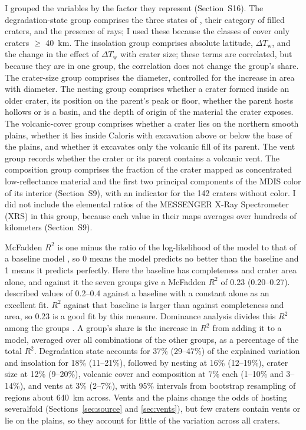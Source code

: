 \documentclass[article,review]{planetary}
\begin{document}
I grouped the variables by the factor they represent (Section~S16). The degradation-state group comprises the three states of \textcite{herrick2018}, their category of filled craters, and the presence of rays; I used these because the classes of \textcite{kinczykMorphologicalEvaluationCrater2020} cover only craters $\geq$ 40~km. The insolation group comprises absolute latitude, $\Delta T_\mathrm{w}$, and the change in the effect of $\Delta T_\mathrm{w}$ with crater size; these terms are correlated, but because they are in one group, the correlation does not change the group's share. The crater-size group comprises the diameter, controlled for the increase in area with diameter. The nesting group comprises whether a crater formed inside an older crater, its position on the parent's peak or floor, whether the parent hosts hollows or is a basin, and the depth of origin of the material the crater exposes. The volcanic-cover group comprises whether a crater lies on the northern smooth plains, whether it lies inside Caloris with excavation above or below the base of the plains, and whether it excavates only the volcanic fill of its parent. The vent group records whether the crater or its parent contains a volcanic vent. The composition group comprises the fraction of the crater mapped as concentrated low-reflectance material and the first two principal components of the MDIS color of its interior (Section~S9), with an indicator for the 142 craters without color. I did not include the elemental ratios of the MESSENGER X-Ray Spectrometer (XRS) in this group, because each value in their maps averages over hundreds of kilometers (Section~S9).

McFadden $R^2$ is one minus the ratio of the log-likelihood of the model to that of a baseline model \parencite{mcfadden1974}, so 0 means the model predicts no better than the baseline and 1 means it predicts perfectly. Here the baseline has completeness and crater area alone, and against it the seven groups give a McFadden $R^2$ of 0.23 (0.20--0.27). \textcite{mcfadden1977} described values of 0.2--0.4 against a baseline with a constant alone as an excellent fit. $R^2$ against that baseline is larger than against completeness and area, so 0.23 is a good fit by this measure. Dominance analysis divides this $R^2$ among the groups \parencite{azen2003,azen2009}. A group's share is the increase in $R^2$ from adding it to a model, averaged over all combinations of the other groups, as a percentage of the total $R^2$. Degradation state accounts for 37\% (29--47\%) of the explained variation and insolation for 18\% (11--21\%), followed by nesting at 16\% (12--19\%), crater size at 12\% (9--20\%), volcanic cover and composition at 7\% each (1--10\% and 3--14\%), and vents at 3\% (2--7\%), with 95\% intervals from bootstrap resampling of regions about 640~km across. Vents and the plains change the odds of hosting severalfold (Sections~\ref{sec:source} and \ref{sec:vents}), but few craters contain vents or lie on the plains, so they account for little of the variation across all craters.
\end{document}
